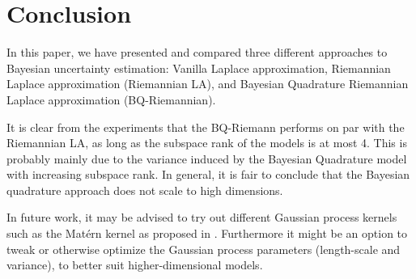 \section{Conclusion}
In this paper, we have presented and compared three different approaches to Bayesian uncertainty estimation: Vanilla Laplace approximation, Riemannian Laplace approximation (Riemannian LA), and Bayesian Quadrature Riemannian Laplace approximation (BQ-Riemannian).

It is clear from the experiments that the BQ-Riemann performs on par with the Riemannian LA, as long as the subspace rank of the models is at most 4. This is probably mainly due to the variance induced by the Bayesian Quadrature model with increasing subspace rank. In general, it is fair to conclude that the Bayesian quadrature approach does not scale to high dimensions.

In future work, it may be advised to try out different Gaussian process kernels such as the Matérn kernel as proposed in \cite{fröhlich2021bayesianquadratureriemanniandata}. Furthermore it might be an option to tweak or otherwise optimize the Gaussian process parameters (length-scale and variance), to better suit higher-dimensional models.